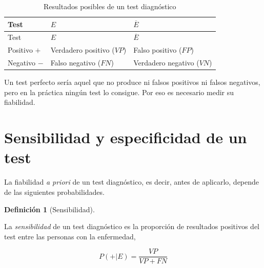 \documentclass[
  spanish,
  a4paper,
]{scrreport}
\theoremstyle{definition}
\newtheorem{definition}{Definición}[chapter]
\theoremstyle{definition}
\theoremstyle{remark}
\begin{document}
\begin{longtable}[]{@{}
  >{\raggedright\arraybackslash}p{}
  >{\centering\arraybackslash}p{}
  >{\centering\arraybackslash}p{}@{}}
\caption{Resultados posibles de un test
diagnóstico}\label{tbl-resultados-test}\tabularnewline
\toprule\noalign{}
\begin{minipage}[b]{\linewidth}\raggedright
Test
\end{minipage} & \begin{minipage}[b]{\linewidth}\centering
\(E\)
\end{minipage} & \begin{minipage}[b]{\linewidth}\centering
\(\overline{E}\)
\end{minipage} \\
\midrule\noalign{}
\endfirsthead
\toprule\noalign{}
\begin{minipage}[b]{\linewidth}\raggedright
Test
\end{minipage} & \begin{minipage}[b]{\linewidth}\centering
\(E\)
\end{minipage} & \begin{minipage}[b]{\linewidth}\centering
\(\overline{E}\)
\end{minipage} \\
\midrule\noalign{}
\endhead
\bottomrule\noalign{}
\endlastfoot
Positivo \(+\) & Verdadero positivo (\(VP\)) & Falso positivo
(\(FP\)) \\
Negativo \(-\) & Falso negativo (\(FN\)) & Verdadero negativo
(\(VN\)) \\
\end{longtable}

Un test perfecto sería aquel que no produce ni falsos positivos ni
falsos negativos, pero en la práctica ningún test lo consigue. Por eso
es necesario medir su fiabilidad.

\section{Sensibilidad y especificidad de un
test}\label{sensibilidad-y-especificidad-de-un-test}

La fiabilidad \emph{a priori} de un test diagnóstico, es decir, antes de
aplicarlo, depende de las siguientes probabilidades.

\begin{definition}[Sensibilidad]\protect\hypertarget{def-sensibilidad}{}\label{def-sensibilidad}

La \emph{sensibilidad} de un test diagnóstico es la proporción de
resultados positivos del test entre las personas con la enfermedad,

\[P(+|E)=\frac{VP}{VP+FN}\]

\end{definition}
\end{document}
